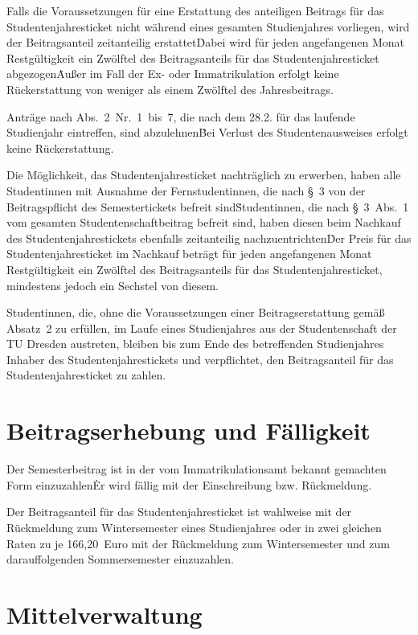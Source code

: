 \begin{multicols}{2}
\Abs \Satz  Falls die Voraussetzungen für eine Erstattung des anteiligen Beitrags für das Studentenjahresticket nicht während eines gesamten Studienjahres vorliegen, wird der Beitragsanteil zeitanteilig erstattet\. Dabei wird für jeden angefangenen Monat Restgültigkeit ein Zwölftel des Beitragsanteils für das Studentenjahresticket abgezogen\. Außer im Fall der Ex- oder Immatrikulation erfolgt keine Rückerstattung von weniger als einem Zwölftel des Jahresbeitrags. 

\Abs \Satz  Anträge nach Abs.~2~Nr.~1~bis~7, die nach dem 28.2. für das laufende Studienjahr eintreffen, sind abzulehnen\. Bei Verlust des Studentenausweises erfolgt keine Rückerstattung. 

\Abs \Satz  Die Möglichkeit, das Studentenjahresticket nachträglich zu erwerben, haben alle Studentinnen mit Ausnahme der Fernstudentinnen, die nach §~3 von der Beitragspflicht des Semestertickets befreit sind\. Studentinnen, die nach §~3~Abs.~1 vom gesamten Studentenschaftbeitrag befreit sind, haben diesen beim Nachkauf des Studentenjahrestickets ebenfalls zeitanteilig nachzuentrichten\. Der Preis für das Studentenjahresticket im Nachkauf beträgt für jeden angefangenen Monat Restgültigkeit ein Zwölftel des Beitragsanteils für das Studentenjahresticket, mindestens jedoch ein Sechstel von diesem.

\Abs \Satz  Studentinnen, die, ohne die Voraussetzungen einer Beitragserstattung gemäß Absatz~2 zu erfüllen, im Laufe eines Studienjahres aus der Studentenschaft der TU Dresden austreten, bleiben bis zum Ende des betreffenden Studienjahres Inhaber des Studentenjahrestickets und verpflichtet, den Beitragsanteil für das Studentenjahresticket zu zahlen.


\section{Beitragserhebung und Fälligkeit}

\Abs \Satz  Der Semesterbeitrag ist in der vom Immatrikulationsamt bekannt gemachten Form einzuzahlen\. Er wird fällig mit der Einschreibung bzw. Rückmeldung.

\Abs \Satz  Der Beitragsanteil für das Studentenjahresticket ist wahlweise mit der Rückmeldung zum Wintersemester eines Studienjahres oder in zwei gleichen Raten zu je 166,20~Euro mit der Rückmeldung zum Wintersemester und zum darauffolgenden Sommersemester einzuzahlen. 

\section{Mittelverwaltung}


\end{multicols}

